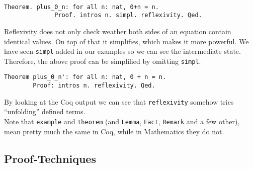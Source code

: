 	   \begin{example}
		   \begin{theorem} ~\\\vspace{-5mm}
	  	   {\normalfont \begin{lstlisting}[caption=\lstinline!plus_0_n!, label=lst:plus_0_n]
	   		Theorem. plus_0_n: for all n: nat, 0+n = n.
	   		  Proof. intros n. simpl. reflexivity. Qed.
	    	\end{lstlisting}}	
		\end{theorem}
		\end{example}              
	    \begin{remark}
	    	Reflexivity does not only check weather both sides of an equation contain identical values. 
	    	On top of that it simplifies, which makes it more powerful. 
	    	We have seen \lstinline!simpl! added in our examples so we can see the intermediate state.
	    	Therefore, the above proof can be simplified by omitting \lstinline!simpl!. 
	     \end{remark}	
	
		\begin{lstlisting}[caption={ \lstinline!plus_0_n'!}, label= lst:plus0nPrime]
	    Theorem plus_0_n': for all n: nat, 0 + n = n.
	    Proof: intros n. reflexivity. Qed.	
	    \end{lstlisting}    
	    By looking at the Coq output we can see that \lstinline!reflexivity! somehow tries ``unfolding'' defined terms.\\    
	    Note that \lstinline!example! and \lstinline!theorem! (and \lstinline!Lemma!, \lstinline!Fact!, \lstinline!Remark! and a few other),
	    mean pretty much the same in Coq, while in Mathematics they do not.
	    
	   
	\subsection{Proof-Techniques}
	\label{subsec:proof-techniques}
	    
